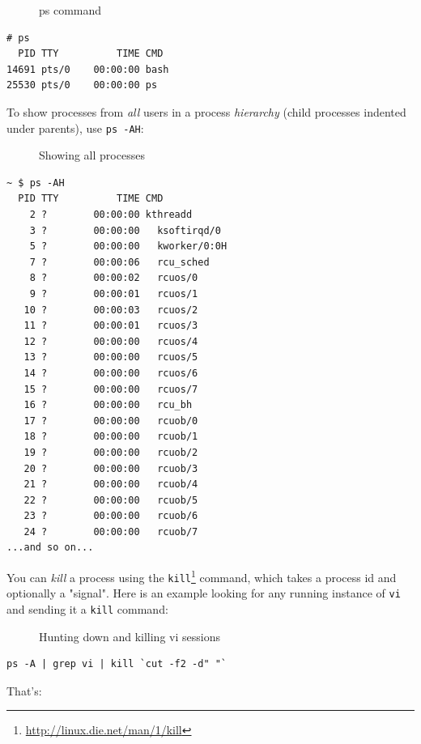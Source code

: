 \documentclass[10pt,]{book}
\renewcommand{\href}[2]{#2\footnote{\url{#1}}}
\numberwithin{figure}{chapter}
\DeclareRobustCommand{\drcap}[1]{\begin{figure}[H]\caption{#1}\end{figure}}
\DeclareRobustCommand{\drcmd}[1]{\index{Commands!#1}}
\begin{document}
\drcap{ps command}

\begin{verbatim}
# ps
  PID TTY          TIME CMD
14691 pts/0    00:00:00 bash
25530 pts/0    00:00:00 ps
\end{verbatim}

To show processes from \emph{all} users in a process \emph{hierarchy}
(child processes indented under parents), use \texttt{ps -AH}:

\drcap{Showing all processes}

\begin{verbatim}
~ $ ps -AH
  PID TTY          TIME CMD
    2 ?        00:00:00 kthreadd
    3 ?        00:00:00   ksoftirqd/0
    5 ?        00:00:00   kworker/0:0H
    7 ?        00:00:06   rcu_sched
    8 ?        00:00:02   rcuos/0
    9 ?        00:00:01   rcuos/1
   10 ?        00:00:03   rcuos/2
   11 ?        00:00:01   rcuos/3
   12 ?        00:00:00   rcuos/4
   13 ?        00:00:00   rcuos/5
   14 ?        00:00:00   rcuos/6
   15 ?        00:00:00   rcuos/7
   16 ?        00:00:00   rcu_bh
   17 ?        00:00:00   rcuob/0
   18 ?        00:00:00   rcuob/1
   19 ?        00:00:00   rcuob/2
   20 ?        00:00:00   rcuob/3
   21 ?        00:00:00   rcuob/4
   22 ?        00:00:00   rcuob/5
   23 ?        00:00:00   rcuob/6
   24 ?        00:00:00   rcuob/7
...and so on...
\end{verbatim}

You can \emph{kill} a process using the
\href{http://linux.die.net/man/1/kill}{\texttt{kill}}\drcmd{kill}
command, which takes a process id and optionally a
"signal". Here is an example looking for any running
instance of \texttt{vi} and sending it a \texttt{kill} command:

\drcap{Hunting down and killing vi sessions}

\begin{verbatim}
ps -A | grep vi | kill `cut -f2 -d" "`
\end{verbatim}

That's:
\end{document}
